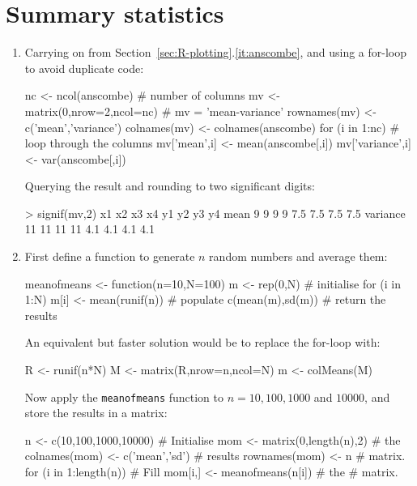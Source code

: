 \section{Summary statistics}
\label{sec:sol-summary-statistics}

\begin{enumerate}
\item Carrying on from Section~\ref{sec:R-plotting}.\ref{it:anscombe},
  and using a for-loop to avoid duplicate code:

\begin{script}
nc <- ncol(anscombe)                  # number of columns
mv <- matrix(0,nrow=2,ncol=nc)        # mv = 'mean-variance'
rownames(mv) <- c('mean','variance')
colnames(mv) <- colnames(anscombe)
for (i in 1:nc){                      # loop through the columns
  mv['mean',i] <- mean(anscombe[,i])
  mv['variance',i] <- var(anscombe[,i])
}
\end{script}

Querying the result and rounding to two significant digits:

\begin{console}
> signif(mv,2)
         x1 x2 x3 x4  y1  y2  y3  y4
mean      9  9  9  9 7.5 7.5 7.5 7.5
variance 11 11 11 11 4.1 4.1 4.1 4.1
\end{console}

\item First define a function to generate $n$ random numbers and
  average them:

\begin{script}
meanofmeans <- function(n=10,N=100){
  m <- rep(0,N)            # initialise
  for (i in 1:N){
    m[i] <- mean(runif(n)) # populate
  }
  c(mean(m),sd(m))         # return the results
}
\end{script}

An equivalent but faster solution would be to replace the for-loop
with:

\begin{script}[firstnumber=3]
  R <- runif(n*N)
  M <- matrix(R,nrow=n,ncol=N)
  m <- colMeans(M)
\end{script}

Now apply the \texttt{meanofmeans} function to $n=10, 100, 1000$ and
$10000$, and store the results in a matrix:

\begin{script}[firstnumber=8]
n <- c(10,100,1000,10000)       # Initialise
mom <- matrix(0,length(n),2)    # the
colnames(mom) <- c('mean','sd') # results
rownames(mom) <- n              # matrix.
for (i in 1:length(n)){         # Fill
  mom[i,] <- meanofmeans(n[i])  # the
}                               # matrix.
\end{script}


\end{enumerate}
